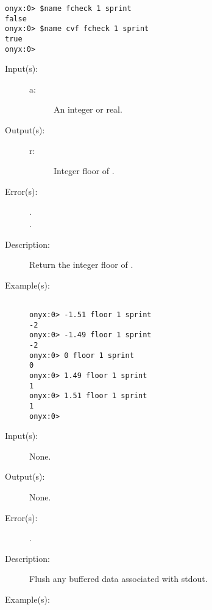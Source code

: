 \begin{description}
\begin{description}
\begin{verbatim}
onyx:0> $name fcheck 1 sprint
false
onyx:0> $name cvf fcheck 1 sprint
true
onyx:0>
		\end{verbatim}
	\end{description}
\label{systemdict:floor}
\item[{\onyxop{a}{floor}{r}}: ]
	\begin{description}\item[]
	\item[Input(s): ]
		\begin{description}\item[]
		\item[a: ]
			An integer or real.
		\end{description}
	\item[Output(s): ]
		\begin{description}\item[]
		\item[r: ]
			Integer floor of .
		\end{description}
	\item[Error(s): ]
		\begin{description}\item[]
		\item[.]
		\item[.]
		\end{description}
	\item[Description: ]
		Return the integer floor of .
	\item[Example(s): ]\begin{verbatim}

onyx:0> -1.51 floor 1 sprint
-2
onyx:0> -1.49 floor 1 sprint
-2
onyx:0> 0 floor 1 sprint
0
onyx:0> 1.49 floor 1 sprint
1
onyx:0> 1.51 floor 1 sprint
1
onyx:0>
		\end{verbatim}
	\end{description}
\label{systemdict:flush}
\item[{\onyxop{--}{flush}{--}}: ]
	\begin{description}\item[]
	\item[Input(s): ] None.
	\item[Output(s): ] None.
	\item[Error(s): ]
		\begin{description}\item[]
		\item[.]
		\end{description}
	\item[Description: ]
		Flush any buffered data associated with stdout.
	\item[Example(s): ]\begin{verbatim}


\end{verbatim}
\end{description}
\end{description}
